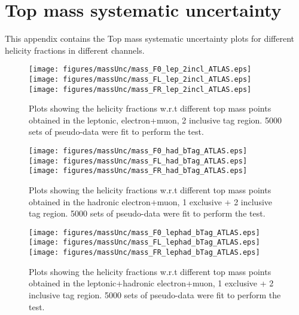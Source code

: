\clearpage
\section{Top mass systematic uncertainty}
\label{app:TopMassSyst}
This appendix contains the Top mass systematic uncertainty plots for different helicity fractions in different channels.

\begin{figure}[!hb]    
      \begin{center}         
        \texttt{[image: figures/massUnc/mass\_F0\_lep\_2incl\_ATLAS.eps]}\\
        \texttt{[image: figures/massUnc/mass\_FL\_lep\_2incl\_ATLAS.eps]}\\
        \texttt{[image: figures/massUnc/mass\_FR\_lep\_2incl\_ATLAS.eps]}\\
        \caption{Plots showing the helicity fractions w.r.t different top mass points obtained in the leptonic, electron+muon, 2 inclusive \bt tag region. 5000 sets of pseudo-data were fit to perform the test.}
  \label{fig:topMass_lephad}
      \end{center}
     \end{figure}


     \begin{figure}[!hb]    
      \begin{center}         
        \texttt{[image: figures/massUnc/mass\_F0\_had\_bTag\_ATLAS.eps]}\\
        \texttt{[image: figures/massUnc/mass\_FL\_had\_bTag\_ATLAS.eps]}\\
        \texttt{[image: figures/massUnc/mass\_FR\_had\_bTag\_ATLAS.eps]}\\
        \caption{Plots showing the helicity fractions w.r.t different top mass points obtained in the hadronic electron+muon, 1 exclusive + 2 inclusive \bt tag region. 5000 sets of pseudo-data were fit to perform the test.}
	\label{fig:topMass_lep}
      \end{center}
     \end{figure}


     \begin{figure}[!hb]    
      \begin{center}         
        \texttt{[image: figures/massUnc/mass\_F0\_lephad\_bTag\_ATLAS.eps]}\\
        \texttt{[image: figures/massUnc/mass\_FL\_lephad\_bTag\_ATLAS.eps]}\\
        \texttt{[image: figures/massUnc/mass\_FR\_lephad\_bTag\_ATLAS.eps]}\\
        \caption{Plots showing the helicity fractions w.r.t different top mass points obtained in the leptonic+hadronic electron+muon, 1 exclusive + 2 inclusive \bt tag region. 5000 sets of pseudo-data were fit to perform the test.}
	\label{fig:topMass_had}
      \end{center}
     \end{figure}